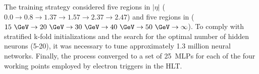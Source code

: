 %


The training strategy considered five regions in $|\eta|$ ($0.0\rightarrow 0.8\rightarrow1.37\rightarrow1.57\rightarrow2.37\rightarrow2.47$) and five regions in \ET ($15~\GeV\rightarrow 20~\GeV\rightarrow 30~\GeV\rightarrow 40~\GeV\rightarrow 50~\GeV\rightarrow\infty$). To comply with stratified k-fold initializations and the search for the optimal number of hidden neurons (5-20), it was necessary to tune approximately 1.3 million neural networks. Finally, the process converged to a set of \SI{25}{MLPs} for each of the four working points employed by electron triggers in the HLT. %

%


